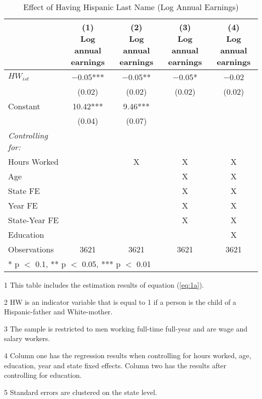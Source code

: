 \begin{table}[H]
\centering\centering
\caption{Effect of Having Hispanic Last Name (Log Annual Earnings) \label{tab:lastnamereg}}
\centering
\begin{threeparttable}
\begin{tabular}[t]{lcccc}
\toprule
  & \specialcell{(1) \\ Log annual \\ earnings} & \specialcell{(2) \\ Log annual \\ earnings} & \specialcell{(3) \\ Log annual \\ earnings} & \specialcell{(4) \\  Log annual \\ earnings}\\
\midrule
$HW_{ist}$ & \num{-0.05}*** & \num{-0.05}** & \num{-0.05}* & \num{-0.02}\\
 & (\num{0.02}) & (\num{0.02}) & (\num{0.02}) & (\num{0.02})\\
Constant & \num{10.42}*** & \num{9.46}*** &  & \\
 & (\num{0.04}) & (\num{0.07}) &  & \\
\midrule
\textit{Controlling for:} &  &  &  & \\
Hours Worked &  & X & X & X\\
Age &  &  & X & X\\
State FE &  &  & X & X\\
Year FE &  &  & X & X\\
State-Year FE &  &  & X & X\\
Education &  &  &  & X\\
Observations & \num{3621} & \num{3621} & \num{3621} & \num{3621}\\
\bottomrule
\multicolumn{5}{l}{\rule{0pt}{1em}* p $<$ 0.1, ** p $<$ 0.05, *** p $<$ 0.01}\\
\end{tabular}
\begin{tablenotes}
\item[1] {\footnotesize{This table includes the estimation results of equation (\ref{eq:1a}).}}
\item[2] {\footnotesize{HW is an indicator variable that is equal to 1 if a person is the child of a Hispanic-father and White-mother.}}
\item[3] {\footnotesize{The sample is restricted to men working full-time full-year and are wage and salary workers.}}
\item[4] {\footnotesize{Column one has the regression results when controlling for hours worked, age, education, year and state fixed effects. Column two has the results after controlling for education.}}
\item[5] {\footnotesize{Standard errors are clustered on the state level.}}
\end{tablenotes}
\end{threeparttable}
\end{table}
